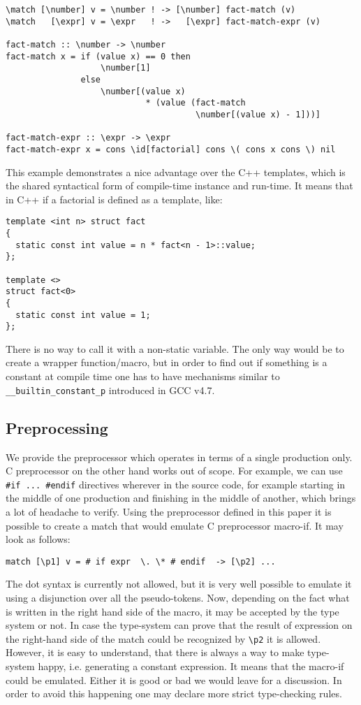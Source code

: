 \begin{verbatim}
\match [\number] v = \number ! -> [\number] fact-match (v)
\match   [\expr] v = \expr   ! ->   [\expr] fact-match-expr (v)

fact-match :: \number -> \number
fact-match x = if (value x) == 0 then
                   \number[1]
               else
                   \number[(value x) 
                            * (value (fact-match 
                                      \number[(value x) - 1]))]

fact-match-expr :: \expr -> \expr
fact-match-expr x = cons \id[factorial] cons \( cons x cons \) nil
\end{verbatim}

This example demonstrates a nice advantage over the C++ templates, which
is the shared syntactical form of compile-time instance and run-time.
It means that in C++ if a factorial is defined as a template, like:
\begin{verbatim}
template <int n> struct fact 
{
  static const int value = n * fact<n - 1>::value;
};
 
template <>
struct fact<0> 
{
  static const int value = 1;
};
\end{verbatim}
There is no way to call it with a non-static variable.  The only way 
would be to create a wrapper function/macro, but in order to find out
if something is a constant at compile time one has to have mechanisms
similar to \verb|__builtin_constant_p| introduced in GCC v4.7.

\subsection{Preprocessing}
We provide the preprocessor which operates in terms of a single
production only.  C preprocessor on the other hand works out of 
scope. For example, we can use \verb|#if ... #endif| directives
wherever in the source code, for example starting in the middle
of one production and finishing in the middle of another, which
brings a lot of headache to verify.  Using the preprocessor 
defined in this paper it is possible to create a match that
would emulate C preprocessor macro-if.  It may look as follows:
\begin{verbatim}
match [\p1] v = # if expr  \. \* # endif  -> [\p2] ...
\end{verbatim}
The dot syntax is currently not allowed, but it is very well
possible to emulate it using a disjunction over all the
pseudo-tokens.  Now, depending on the fact what is written in
the right hand side of the macro, it may be accepted by the type
system or not.  In case the type-system can prove that the result
of expression on the right-hand side of the match could be 
recognized by \verb|\p2| it is allowed.  However, it is easy
to understand, that there is always a way to make type-system 
happy, i.e. generating a constant expression.  It means that
the macro-if could be emulated.  Either it is good or bad we
would leave for a discussion.  In order to avoid this happening
one may declare more strict type-checking rules.
